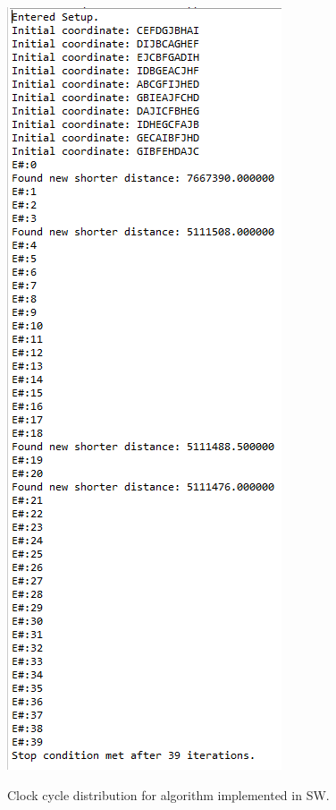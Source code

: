 \begin{figure}[H]
	\centering
	{\includegraphics[width=\textwidth/2]{Images/algo_test_sw.png}}\\[0.5cm]
	\caption{Clock cycle distribution for algorithm implemented in SW.}
	\label{fig:algo_test_sw_bar}
\end{figure}

